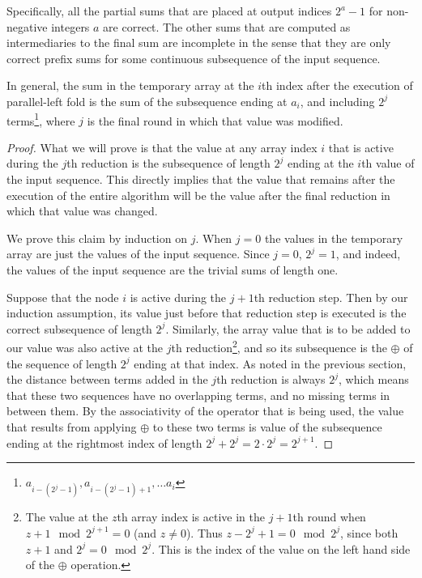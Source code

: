 \documentclass[12pt,twoside]{reedthesis}
\begin{document}
Specifically, all the partial sums that are placed at output indices $2^a-1$ for non-negative integers $a$ are correct. The other sums that are computed as intermediaries to the final sum are incomplete in the sense that they are only correct prefix sums for some continuous subsequence of the input sequence.

In general, the sum in the temporary array at the $i$th index after the execution of parallel-left fold is the sum of the subsequence ending at $a_i$, and including $2^j$ terms\footnote{$a_{i-(2^j-1)},  a_{i-(2^j-1)+1}, \ldots a_i$}, where $j$ is the final round in which that value was modified.

\begin{proof}
What we will prove is that the value at any array index $i$ that is active during the $j$th reduction is the subsequence of length $2^j$ ending at the $i$th value of the input sequence. This directly implies that the value that remains after the execution of the entire algorithm will be the value after the final reduction in which that value was changed.

We prove this claim by induction on $j$. When $j=0$ the values in the temporary array are just the values of the input sequence. Since $j=0$, $2^j = 1$, and indeed, the values of the input sequence are the trivial sums of length one.

Suppose that the node $i$  is active during the $j+1$th reduction step. Then by our induction assumption, its value just before that reduction step is executed is the correct subsequence of length $2^j$. Similarly, the array value that is to be added to our value was also active at the $j$th reduction\footnote{The value at the $z$th array index is active in the $j+1$th round when $z+1 \mod 2^{j+1} = 0$ (and $z \neq 0$). Thus $z - 2^j +  1 = 0 \mod 2^j$, since both $z+1$ and $2^j = 0 \mod 2^j$. This is the index of the value on the left hand side of the $\oplus$ operation.}, and so its subsequence is the $\oplus$ of the sequence of length $2^j$ ending at that index. As noted in the previous section, the distance between terms added in the $j$th reduction is always $2^j$, which means that these two sequences have no overlapping terms, and no missing terms in between them. By the associativity of the operator that is being used, the value that results from applying $\oplus$ to these two terms is value of the subsequence ending at the rightmost index of length $2^j + 2^j = 2 \cdot 2^j = 2^{j+1}$.
\end{proof}
\end{document}
